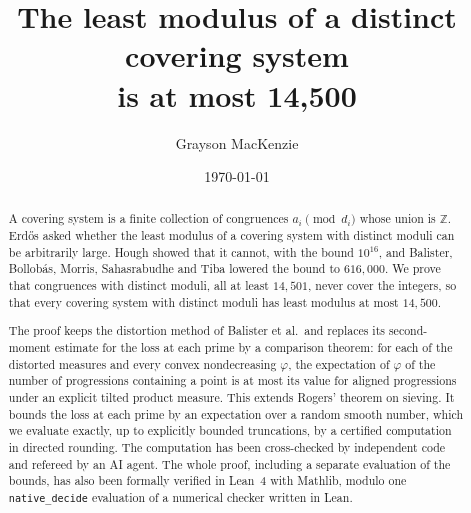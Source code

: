 \documentclass[11pt]{amsart}
\newcommand{\Mbound}{14{,}500}          %
\newcommand{\Mzero}{14{,}501}           %
\newcommand{\prevBound}{616{,}000}      %
\theoremstyle{plain}
\theoremstyle{definition}
\numberwithin{equation}{section}
\newcommand{\Z}{\mathbb{Z}}
\begin{document}
\title[The least modulus of a distinct covering system]{The least modulus of a distinct covering system\\ is at most \Mbound}
\author{Grayson MacKenzie}
\date{\today}

\begin{abstract}
A covering system is a finite collection of congruences $a_i \pmod{d_i}$ whose union is $\Z$. Erd\H{o}s asked
whether the least modulus of a covering system with distinct moduli can be arbitrarily large. Hough showed that
it cannot, with the bound $10^{16}$, and Balister, Bollob\'as, Morris, Sahasrabudhe and Tiba lowered the bound to
$\prevBound$. We prove that congruences with distinct moduli, all at least $\Mzero$, never cover the integers, so
that every covering system with distinct moduli has least modulus at most $\Mbound$.

The proof keeps the distortion method of Balister et al.\ and replaces its second-moment estimate for the loss
at each prime by a comparison theorem: for each of the distorted measures and every convex nondecreasing $\varphi$,
the expectation of $\varphi$ of the number of progressions containing a point is at most its value for aligned
progressions under an explicit tilted product measure. This extends Rogers' theorem on sieving. It bounds the loss at
each prime by an expectation over a random smooth number, which we evaluate exactly, up to explicitly bounded
truncations, by a certified computation in directed rounding. The computation has been cross-checked by independent
code and refereed by an AI agent. The whole proof, including a separate evaluation of the bounds, has also been
formally verified in Lean~4 with Mathlib, modulo one \texttt{native\_decide} evaluation of a numerical checker written in Lean.
\end{abstract}

\maketitle
\setcounter{tocdepth}{1}
\tableofcontents








\end{document}
